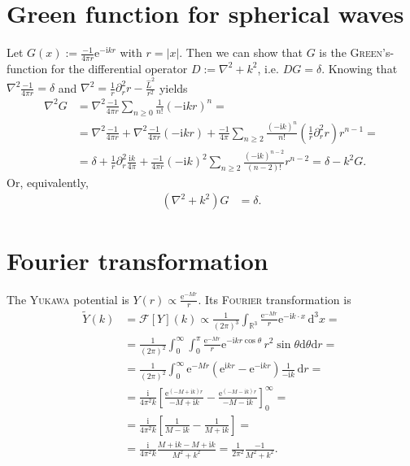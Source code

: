 \documentclass[english, parskip=full]{scrartcl}
\newcommand{\intx}{}
\newcommand{\intr}{}
\newcommand{\kla}{}
\newcommand{\klam}{}
\def\I{\text{i}}
\def\e{\text{e}}
\begin{document}
\section{Green function for spherical waves}
Let $G(x):=\frac{-1}{4\pi r}\e^{-\I kr}$ with $r=|x|$. 
Then we can show that $G$ is the \textsc{Green}'s-function for the differential operator $D:=\nabla^2+k^2$, i.e. $DG=\delta$.
Knowing that $\nabla^2\frac{-1}{4\pi r}=\delta$ and $\nabla^2=\frac{1}{r}\partial_r^2r-\frac{\hat{L}^2}{r^2}$ yields
\begin{align}
\nabla^2G&=\nabla^2\frac{-1}{4\pi r}\sum_{n\ge 0}\frac{1}{n!}(-\I kr)^n=\\
&=\nabla^2\frac{-1}{4\pi r}+\nabla^2\frac{-1}{4\pi r}(-\I kr)+\frac{-1}{4\pi}\sum_{n\ge 2}\frac{(-\I k)^n}{n!}\kla\left( {\frac{1}{r}\partial_r^2r} \right) r^{n-1}=\\
&=\delta+\frac{1}{r}\partial_r^2\frac{\I k}{4\pi}+\frac{-1}{4\pi r}(-\I k)^2\sum_{n\ge 2}\frac{(-\I k)^{n-2}}{(n-2)!}r^{n-2}=\delta -k^2G.
\end{align}
Or, equivalently,
\begin{align}
(\nabla^2+k^2)G&=\delta.
\end{align}
\section{Fourier transformation}
The \textsc{Yukawa} potential is $Y(r)\propto \frac{\e^{-Mr}}{r}$.
Its \textsc{Fourier} transformation is
\begin{align}
\tilde{Y}(k)&=\mathcal{F}[Y](k)\propto \frac{1}{(2\pi)^3}\intr\int_{\mathbb{R}^{3}}\frac{\e^{-Mr}}{r}\e^{-\I k\cdot x}\,\mathrm{d}^{3}x=\\
&=\frac{1}{(2\pi)^2}\intx\int_{0}^{\infty}\intx\int_{0}^{\pi}\frac{\e^{-Mr}}{r}\e^{-\I kr\cos\theta}\,r^2\sin\theta\mathrm{d}\theta\mathrm{d}r=\\
&=\frac{1}{(2\pi)^2}\intx\int_{0}^{\infty}\e^{-Mr}\kla\left( \e^{\I kr}-\e^{-\I kr} \right)\frac{1}{-\I k}\,\mathrm{d}r=\\
&=\frac{\I}{4\pi^2k}\klam\left[ \frac{\e^{(-M+\I k)r}}{-M+\I k}-\frac{\e^{(-M-\I k)r}}{-M-\I k} \right]_0^\infty=\\
&=\frac{\I}{4\pi^2k}\klam\left[ {\frac{1}{M-\I k}-\frac{1}{M+\I k}} \right]=\\
&=\frac{\I}{4\pi^2k}\frac{M+\I k-M+\I k}{M^2+k^2}=\frac{1}{2\pi^2}\frac{-1}{M^2+k^2}.
\end{align}
\end{document}
